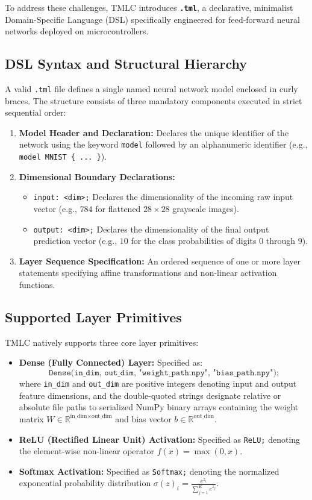\documentclass[11pt,a4paper]{article}
\begin{document}
To address these challenges, TMLC introduces \textbf{\texttt{.tml}}, a declarative, minimalist Domain-Specific Language (DSL) specifically engineered for feed-forward neural networks deployed on microcontrollers.

\subsection{DSL Syntax and Structural Hierarchy}
A valid \texttt{.tml} file defines a single named neural network model enclosed in curly braces. The structure consists of three mandatory components executed in strict sequential order:
\begin{enumerate}
    \item \textbf{Model Header and Declaration:} Declares the unique identifier of the network using the keyword \texttt{model} followed by an alphanumeric identifier (e.g., \texttt{model MNIST \{ ... \}}).
    \item \textbf{Dimensional Boundary Declarations:}
    \begin{itemize}
        \item \texttt{input: <dim>;} Declares the dimensionality of the incoming raw input vector (e.g., $784$ for flattened $28 \times 28$ grayscale images).
        \item \texttt{output: <dim>;} Declares the dimensionality of the final output prediction vector (e.g., $10$ for the class probabilities of digits $0$ through $9$).
    \end{itemize}
    \item \textbf{Layer Sequence Specification:} An ordered sequence of one or more layer statements specifying affine transformations and non-linear activation functions.
\end{enumerate}

\subsection{Supported Layer Primitives}
TMLC natively supports three core layer primitives:
\begin{itemize}[leftmargin=*]
    \item \textbf{Dense (Fully Connected) Layer:} Specified as:
    \begin{equation}
        \texttt{Dense(in\_dim, out\_dim, "weight\_path.npy", "bias\_path.npy");}
    \end{equation}
    where \texttt{in\_dim} and \texttt{out\_dim} are positive integers denoting input and output feature dimensions, and the double-quoted strings designate relative or absolute file paths to serialized NumPy binary arrays containing the weight matrix $W \in \mathbb{R}^{\text{in\_dim} \times \text{out\_dim}}$ and bias vector $b \in \mathbb{R}^{\text{out\_dim}}$.
    \item \textbf{ReLU (Rectified Linear Unit) Activation:} Specified as \texttt{ReLU;} denoting the element-wise non-linear operator $f(x) = \max(0, x)$.
    \item \textbf{Softmax Activation:} Specified as \texttt{Softmax;} denoting the normalized exponential probability distribution $\sigma(z)_i = \frac{e^{z_i}}{\sum_{j=1}^K e^{z_j}}$.
\end{itemize}
\end{document}
